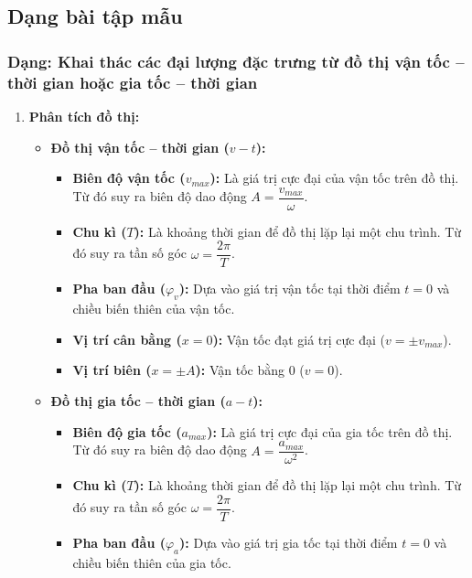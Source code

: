 

\subsection{Dạng bài tập mẫu}
\subsubsection{Dạng: Khai thác các đại lượng đặc trưng từ đồ thị vận tốc – thời gian hoặc gia tốc – thời gian}
\begin{phuongphap}
\begin{enumerate}
    \item \textbf{Phân tích đồ thị:}
    \begin{itemize}
        \item \textbf{Đồ thị vận tốc – thời gian ($v-t$):}
        \begin{itemize}
            \item \textbf{Biên độ vận tốc ($v_{max}$):} Là giá trị cực đại của vận tốc trên đồ thị. Từ đó suy ra biên độ dao động $A = \dfrac{v_{max}}{\omega}$.
            \item \textbf{Chu kì ($T$):} Là khoảng thời gian để đồ thị lặp lại một chu trình. Từ đó suy ra tần số góc $\omega = \dfrac{2\pi}{T}$.
            \item \textbf{Pha ban đầu ($\varphi_v$):} Dựa vào giá trị vận tốc tại thời điểm $t=0$ và chiều biến thiên của vận tốc.
            \item \textbf{Vị trí cân bằng ($x=0$):} Vận tốc đạt giá trị cực đại ($v = \pm v_{max}$).
            \item \textbf{Vị trí biên ($x=\pm A$):} Vận tốc bằng 0 ($v=0$).
        \end{itemize}
        \item \textbf{Đồ thị gia tốc – thời gian ($a-t$):}
        \begin{itemize}
            \item \textbf{Biên độ gia tốc ($a_{max}$):} Là giá trị cực đại của gia tốc trên đồ thị. Từ đó suy ra biên độ dao động $A = \dfrac{a_{max}}{\omega^2}$.
            \item \textbf{Chu kì ($T$):} Là khoảng thời gian để đồ thị lặp lại một chu trình. Từ đó suy ra tần số góc $\omega = \dfrac{2\pi}{T}$.
            \item \textbf{Pha ban đầu ($\varphi_a$):} Dựa vào giá trị gia tốc tại thời điểm $t=0$ và chiều biến thiên của gia tốc.

\end{itemize}
\end{itemize}
\end{enumerate}
\end{phuongphap}

